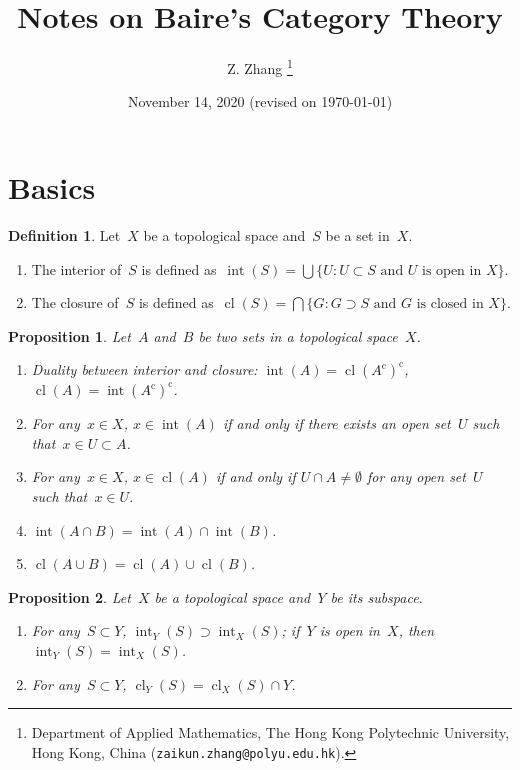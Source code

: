 \documentclass[11pt,a4paper]{article}  %
\title{Notes on Baire's Category Theory}
\date{November 14, 2020 (revised on \today)}
\author{
Z. Zhang
\thanks{
Department of Applied Mathematics, The Hong Kong Polytechnic
University, Hong Kong, China ({\tt zaikun.zhang@polyu.edu.hk}).
}
}
\newtheorem{proposition}{Proposition}[section]
\theoremstyle{definition}
\newtheorem{definition}{Definition}[section]
\newcommand{\co}{{\mathrm{c}}}
\DeclareMathOperator{\inter}{int}
\DeclareMathOperator{\cl}{cl}
\numberwithin{equation}{section}
\begin{document}
\maketitle

\section{Basics}

\begin{definition}
  \label{def:intcl}
  Let~$X$ be a topological space and~$S$ be a set in~$X$.
  \begin{enumerate}
    \item The interior of~$S$ is defined as~$\inter(S) = \bigcup\{U \mathrel{:} U\subset S \text{ and } U \text{ is open in } X\}$.
    \item The closure of~$S$ is defined as~$\cl(S) = \bigcap\{G \mathrel{:} G\supset S \text{ and } G \text{ is closed in } X\}$.
  \end{enumerate}
\end{definition}


\begin{proposition}
  \label{prop:intcl}
  Let~$A$ and~$B$ be two sets in a topological space~$X$.
  \begin{enumerate}
    \item Duality between interior and closure: $\inter(A) = \cl(A^\co)^\co$, $\cl(A)=\inter(A^\co)^\co$.
    \item For any~$x\in X$, $x\in \inter(A)$ if and only if there exists an open set~$U$ such that~$x\in U \subset A$.
    \item For any~$x\in X$, $x\in \cl(A)$ if and only if $U\cap A \neq \emptyset$ for any open set~$U$ such that~$x\in U$.
    \item $\inter(A\cap B) = \inter(A)\cap \inter(B)$.
    \item $\cl(A\cup B) = \cl(A)\cup \cl(B)$.
    \end{enumerate}
\end{proposition}

\begin{proposition}
  \label{prop:subintcl}
  Let~$X$ be a topological space and~$Y$ be its subspace.
  \begin{enumerate}
    \item For any~$S\subset Y$, $\inter_Y(S) \supset \inter_X(S)$;
      if~$Y$ is open in~$X$, then $\inter_Y(S)=\inter_X(S)$.
    \item For any~$S\subset Y$, $\cl_Y(S) = \cl_X(S) \cap Y$.
  \end{enumerate}
\end{proposition}
\end{document}
